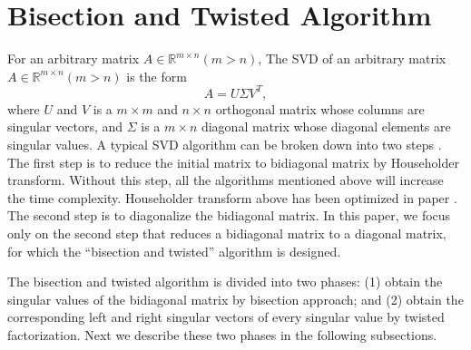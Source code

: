 \section{Bisection and Twisted Algorithm} \label{sec:algorithm}
For an arbitrary matrix $A\in \mathbb{R}^{m \times n} (m>n)$,
The SVD of an arbitrary matrix $A\in \mathbb{R}^{m \times n} (m>n)$ is the form 
\[A = U \Sigma V^T,\] where $U$ and $V$ is a $m \times m$ and $n \times n$ orthogonal matrix whose columns are singular vectors, and $\Sigma$ is a $m\times n$ diagonal matrix whose diagonal elements are singular values.
A typical SVD algorithm can be broken down into two steps \cite{65SIAM}.
The first step is to reduce the initial matrix to bidiagonal matrix by Householder transform. Without this step, all the algorithms mentioned above will increase the time complexity.
Householder transform above has been optimized in paper \cite{LiuHouseholder}.
The second step is to diagonalize the bidiagonal matrix.
In this paper, we focus only on the second step that reduces a bidiagonal matrix to a diagonal matrix, for which the ``bisection and twisted'' algorithm is designed.
 
The bisection and twisted algorithm is divided into two phases:
(1) obtain the singular values of the bidiagonal matrix by bisection approach; and
(2) obtain the corresponding left and right singular vectors of every singular value by twisted factorization.
Next we describe these two phases in the following subsections.

